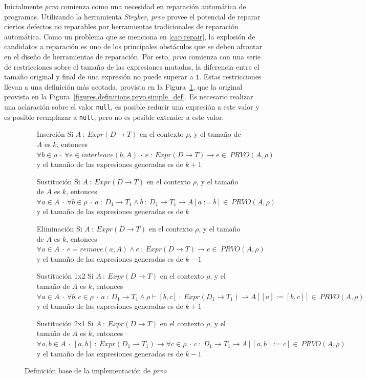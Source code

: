 Inicialmente \emph{prvo} comienza como una necesidad en reparaci\'on autom\'atica de programas. Utilizando la herramienta \emph{Stryker}, \emph{prvo} provee el potencial de reparar ciertos defectos no reparables por herramientas tradicionales de reparaci\'on autom\'atica. Como un problema que se menciona en \ref{cap:repair}, la explosi\'on de candidatos a reparaci\'on es uno de los principales obst\'aculos que se deben afrontar en el dise\~no de herramientas de reparaci\'on. Por esto, \emph{prvo} comienza con una serie de restricciones sobre el tama\~no de las expresiones mutadas, la diferencia entre el tama\~no original y final de una expresi\'on no puede superar a \texttt{1}. Estas restricciones llevan a una definici\'on m\'as acotada, provista en la Figura~\ref{figures.definitions.prvo.impl_def}, que la original provista en la Figura~\ref{figures.definitions.prvo.simple_def}. Es necesario realizar una aclaraci\'on sobre el valor \texttt{null}, es posible reducir una expresi\'on a este valor y es posible reemplazar a \texttt{null}, pero no es posible extender a este valor.

\begin{figure}[H]
	\begin{enumerate}[leftmargin=.75cm,align=left]
		\item [Inserci\'on] Si $A\::\:Expr(D \rightarrow T)$ en el contexto $\rho$, y el tama\~no de $A$ es $k$, entonces $\forall b \in \rho \:\cdot\:  \forall e \in interleave(b, A)\:\cdot\: e\::\: Expr(D \rightarrow T) \rightarrow e\in\:PRVO(A, \rho)$ y el tama\~no de las expresiones generadas es de $k+1$
		\item [Sustituci\'on] Si $A\::\:Expr(D \rightarrow T)$ en el contexto $\rho$, y el tama\~no de $A$ es $k$, entonces $\forall a \in A \:\cdot\: \forall b \in \rho \:\cdot\: a\::\:D_1 \rightarrow T_1 \wedge b\::\:D_1 \rightarrow T_1 \rightarrow A[a := b] \in\:PRVO(A, \rho)$ y el tama\~no de las expresiones generadas es de $k$
		\item[Eliminaci\'on] Si $A\::\:Expr(D \rightarrow T)$ en el contexto $\rho$, y el tama\~no de $A$ es $k$, entonces $\forall a \in A \:\cdot\: e = remove(a,A) \wedge e\::\:Expr(D \rightarrow T) \rightarrow e\in\:PRVO(A, \rho)$ y el tama\~no de las expresiones generadas es de $k-1$
		\item[Sustituci\'on 1x2] Si $A\::\:Expr(D \rightarrow T)$ en el contexto $\rho$, y el tama\~no de $A$ es $k$, entonces $\forall a \in A \:\cdot\: \forall b,c \in\rho \:\cdot\: a\::\:D_1 \rightarrow T_1 \wedge \rho\vdash[b,c]\::\:Expr(D_1 \rightarrow T_1) \rightarrow A[[a] := [b,c]] \in\:PRVO(A, \rho)$ y el tama\~no de las expresiones generadas es de $k+1$
		\item[Sustituci\'on 2x1] Si $A\::\:Expr(D \rightarrow T)$ en el contexto $\rho$, y el tama\~no de $A$ es $k$, entonces $\forall a,b \in A \:\cdot\: [a,b]\::\:Expr(D_1 \rightarrow T_1) \rightarrow \forall c \in \rho \:\cdot\: c \::\: D_1 \rightarrow T_1 \rightarrow A[[a,b] := c] \in\:PRVO(A, \rho)$ y el tama\~no de las expresiones generadas es de $k-1$
	\end{enumerate}
	\caption{Definici\'on base de la implementaci\'on de \emph{prvo}}
	\label{figures.definitions.prvo.impl_def}
\end{figure}


